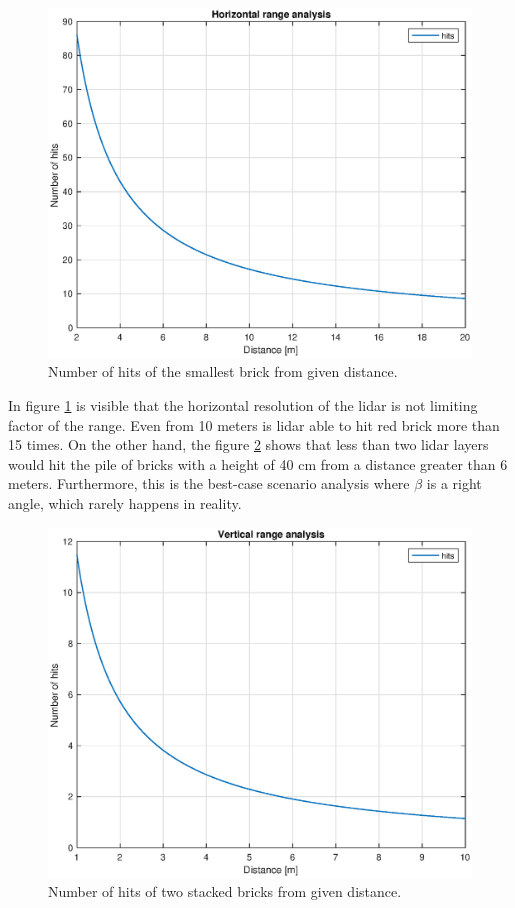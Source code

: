 \begin{figure}[H]
	\centering
	\includegraphics[scale=0.55]{fig/horizontal_range.eps}
	\caption[Horizontal range chart]{Number of hits of the smallest brick from given distance.}
	\label{fig:horizontal_hits}
\end{figure}

In figure \ref{fig:horizontal_hits} is visible that the horizontal resolution of the lidar is not limiting factor of the range. Even from 10 meters is lidar able to hit red brick more than 15 times. On the other hand, the figure \ref{fig:vertical_hits} shows that less than two lidar layers would hit the pile of bricks with a height of 40 cm from a distance greater than 6 meters. Furthermore, this is the best-case scenario analysis where $\beta$ is a right angle, which rarely happens in reality.

\begin{figure}[H]
	\centering
	\includegraphics[scale=0.55]{fig/vertical_range.eps}
	\caption[Vertical range chart]{Number of hits of two stacked bricks from given distance.}
	\label{fig:vertical_hits}
\end{figure}

